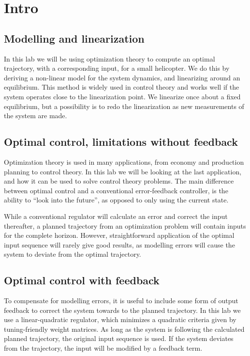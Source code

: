 \section{Intro}
\subsection{Modelling and linearization}
In this lab we will be using optimization theory to compute an optimal trajectory, with a corresponding input, for a small helicopter. We do this by deriving a non-linear model for
the system dynamics, and linearizing around an equilibrium. This method is widely used in
control theory and works well if the system operates close to the linearization point. We linearize once about a fixed equilibrium, but a possibility is to redo the linearization as new measurements of the system are made.

\subsection{Optimal control, limitations without feedback}
Optimization theory is used in many applications, from economy and production planning to control theory. In this lab we will be looking at the last application, and how it can be used to solve control theory problems. The main difference between optimal control and a conventional error-feedback controller, is the ability to ``look into the future'', as opposed to only using the current state.

While a conventional regulator will calculate an error and correct the input thereafter, a planned trajectory from an optimization problem will contain inputs for the complete horizon. However, straightforward application of the optimal input sequence will rarely give good results, as modelling errors will cause the system to deviate from the optimal trajectory.

\subsection{Optimal control with feedback}
To compensate for modelling errors, it is useful to include some form of output feedback to correct
the system towards to the planned trajectory. In this lab we use a linear-quadratic regulator, which minimizes a quadratic criteria given by tuning-friendly weight matrices. As long as the system is following the calculated planned trajectory, the original input sequence is used. If the system deviates from the trajectory, the input will be modified by a feedback term.

